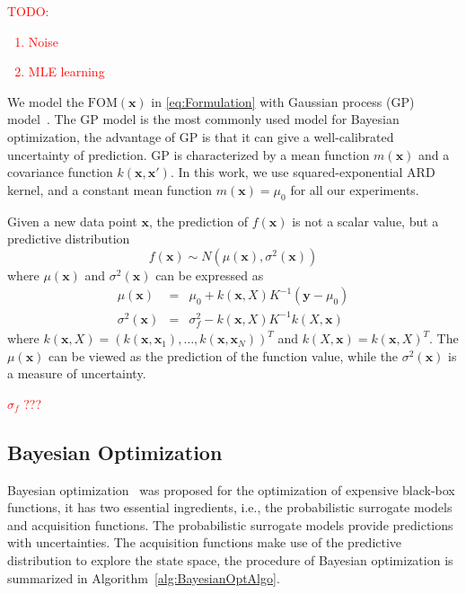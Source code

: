 \textcolor{red}{
    TODO:
    \begin{enumerate}
            \item Noise
            \item MLE learning
    \end{enumerate}
}

We model the $\mathrm{FOM}(\bm{x})$ in \eqref{eq:Formulation} with Gaussian
process (GP) model~\cite{GPML}. The GP model is the most commonly used model
for Bayesian optimization, the advantage of GP is that it can give a
well-calibrated uncertainty of prediction. GP is characterized by a mean
function $m(\bm{x})$ and a covariance function $k(\bm{x}, \bm{x'})$. In this
work, we use squared-exponential ARD kernel, and a constant mean function
$m(\bm{x}) = \mu_0$ for all our experiments.

Given a new data point $\bm{x}$, the prediction of $f(\bm{x})$ is
not a scalar value, but a predictive distribution 
\begin{equation}
f(\bm{x}) \sim N(\mu(\bm{x}),
\sigma^2(\bm{x}))
\label{eq:GPRPred}
\end{equation}
where $\mu(\bm{x})$ and $\sigma^2(\bm{x})$ can be expressed as
\begin{equation}
        \begin{array}{lll}
            \mu(\bm{x}) &=& \mu_0 + k(\bm{x},X)K^{-1}(\bm{y} - \mu_0) \\
            \sigma^2(\bm{x}) &=& \sigma_f^2 - k(\bm{x}, X)K^{-1}k(X, \bm{x})
        \end{array}
    \label{eq:GPRPredEqNoisy}
\end{equation}
where $k(\bm{x}, X) = (k(\bm{x}, \bm{x}_1), \dots, k(\bm{x},
\bm{x}_N))^T$ and $k(X, \bm{x}) = k(\bm{x}, X)^T$. The
$\mu(\bm{x})$ can be viewed as the prediction of the function value, while
the $\sigma^2(\bm{x})$ is a measure of uncertainty. 

\textcolor{red}{$\sigma_f$ ???}

\subsection{Bayesian Optimization}

Bayesian optimization~\cite{shahriari2016taking} was proposed for the
optimization of expensive black-box functions, it has two essential
ingredients, i.e., the probabilistic surrogate models and acquisition
functions. The probabilistic surrogate models provide predictions with
uncertainties. The acquisition functions make use of the predictive
distribution to explore the state space, the procedure of Bayesian optimization
is summarized in Algorithm~\ref{alg:BayesianOptAlgo}.



